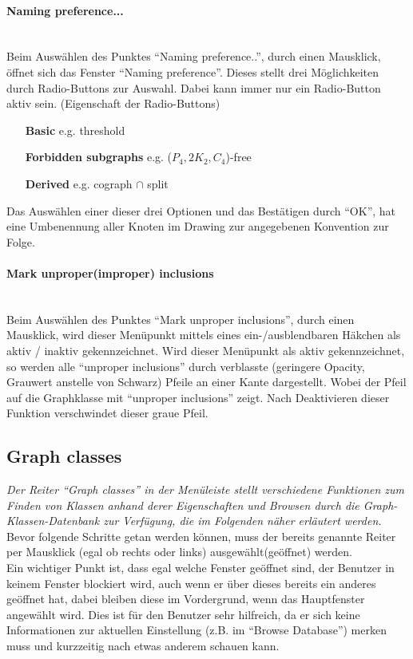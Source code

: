 \documentclass[10pt,a4paper]{article}
\begin{document}
\paragraph{Naming preference...}\ \\
Beim Auswählen des Punktes "`Naming preference.."', durch einen Mausklick, öffnet sich das Fenster "`Naming preference"'. Dieses stellt drei Möglichkeiten durch Radio-Buttons zur Auswahl. Dabei kann immer nur ein Radio-Button aktiv sein. (Eigenschaft der Radio-Buttons) \\
\begin{itemize}
	\item[\bf{Basic}] e.g. threshold
	\item[\bf{Forbidden subgraphs}] e.g. ($P_4,2K_2,C_4$)-free
	\item[\bf{Derived}] e.g. cograph $\cap$ split\\
\end{itemize}
Das Auswählen einer dieser drei Optionen und das Bestätigen durch "`OK"', hat eine Umbenennung aller Knoten im Drawing zur angegebenen Konvention zur Folge.

\paragraph{Mark unproper(improper) inclusions}\ \\
Beim Auswählen des Punktes "`Mark unproper inclusions"', durch einen Mausklick, wird dieser Menüpunkt mittels eines ein-/ausblendbaren Häkchen als aktiv / inaktiv gekennzeichnet. Wird dieser Menüpunkt als aktiv gekennzeichnet, so werden alle "`unproper inclusions"' durch verblasste (geringere Opacity, Grauwert anstelle von Schwarz) Pfeile an einer Kante dargestellt. Wobei der Pfeil auf die Graphklasse mit "`unproper inclusions"' zeigt. Nach Deaktivieren dieser Funktion verschwindet dieser graue Pfeil.


\subsection{Graph classes}
\emph{Der Reiter "`Graph classes"' in der Menüleiste stellt verschiedene Funktionen zum Finden von Klassen anhand derer Eigenschaften und Browsen durch die Graph-Klassen-Datenbank zur Verfügung, die im Folgenden näher erläutert werden.}
Bevor folgende Schritte getan werden können, muss der bereits genannte Reiter per Mausklick (egal ob rechts oder links) ausgewählt(geöffnet) werden.\\
Ein wichtiger Punkt ist, dass egal welche Fenster geöffnet sind, der Benutzer in keinem Fenster blockiert wird, auch wenn er über dieses bereits ein anderes geöffnet hat, dabei bleiben diese im Vordergrund, wenn das Hauptfenster angewählt wird. Dies ist für den Benutzer sehr hilfreich, da er sich keine Informationen zur aktuellen Einstellung (z.B. im "`Browse Database"') merken muss und kurzzeitig nach etwas anderem schauen kann.
\end{document}
